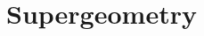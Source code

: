 \documentclass[a4paper,10pt]{scrreprt}
\newcommand{\R}{\mathbb{R}}
\theoremstyle{definition}
\newtheorem{definition}{Definition}[section]
\theoremstyle{plain}
\newtheorem{theorem}{Theorem}[section]
\theoremstyle{remark}
\newtheorem{note}{Note}[section]
\begin{document}
\section{Supergeometry}
%
%
%
%
\end{document}

